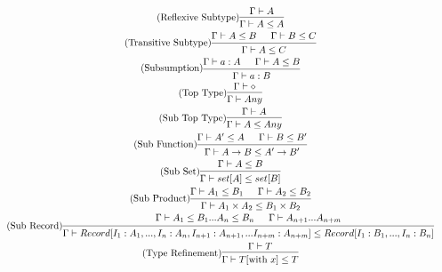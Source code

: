 \documentclass{article}
\begin{document}
\begin{gather}
\tag{Reflexive Subtype}
\begin{prooftree}
\hypo{\Gamma \vdash A}
\infer1{\Gamma \vdash A \leq A}
\end{prooftree}
\\
\tag{Transitive Subtype}
\begin{prooftree}
\hypo{\Gamma \vdash A \leq B}
\hypo{\Gamma \vdash B \leq C}
\infer2{\Gamma \vdash A \leq C}
\end{prooftree}
\\
\tag{Subsumption}
\begin{prooftree}
\hypo{\Gamma \vdash a:A}
\hypo{\Gamma \vdash A \leq B}
\infer2{\Gamma \vdash a: B}
\end{prooftree}
\\
\tag{Top Type}
\begin{prooftree}
\hypo{\Gamma \vdash \diamond}
\infer1{\Gamma \vdash Any}
\end{prooftree}
\\
\tag{Sub Top Type}
\begin{prooftree}
\hypo{\Gamma \vdash A}
\infer1{\Gamma \vdash A \leq Any}
\end{prooftree}
\\
\tag{Sub Function}
\begin{prooftree}
\hypo{\Gamma \vdash A' \leq A}
\hypo{\Gamma \vdash B \leq B'}
\infer2{\Gamma \vdash A \rightarrow B \leq A' \rightarrow B'}
\end{prooftree}
\\
\tag{Sub Set}
\begin{prooftree}
\hypo{\Gamma \vdash A \leq B}
\infer1{\Gamma \vdash set[A] \leq set[B]}
\end{prooftree}
\\
\tag{Sub Product}
\begin{prooftree}
\hypo{\Gamma \vdash A_1 \leq B_1}
\hypo{\Gamma \vdash A_2 \leq B_2}
\infer2{\Gamma \vdash A_1 \times A_2 \leq B_1 \times B_2 }
\end{prooftree}
\\
\tag{Sub Record}
\begin{prooftree}
\hypo{\Gamma \vdash A_1 \leq B_1 ... A_n \leq B_n}
\hypo{\Gamma \vdash A_{n+1} ... A_{n+m}}
\infer2{\Gamma \vdash  Record[I_1: A_1, ..., I_n: A_n, I_{n+1}: A_{n+1}, ... I_{n+m}: A_{n+m}] \leq  Record[I_1: B_1, ..., I_n: B_n]}
\end{prooftree}
\\
\tag{Type Refinement}
\begin{prooftree}
\hypo{\Gamma \vdash T}
\infer1{\Gamma \vdash T[\text{with } x] \leq T}
\end{prooftree}
\end{gather}
\end{document}

